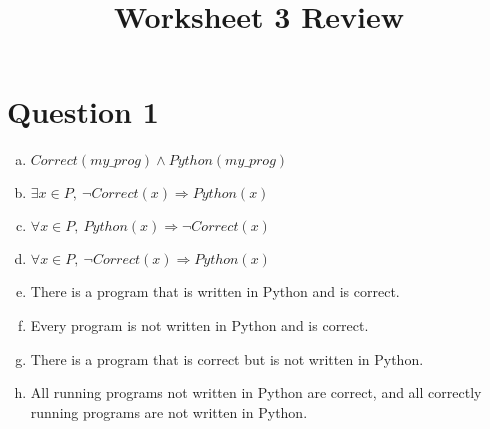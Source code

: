 \documentclass[12pt]{article}
\begin{document}
\title{Worksheet 3 Review}
\maketitle

\section*{Question 1}
\begin{enumerate}[a.]
    \item

    $Correct(my\_prog) \land Python(my\_prog)$

    \item

    $\exists x \in P,\:\neg Correct(x) \Rightarrow Python(x)$

    \item

    $\forall x \in P,\:Python(x) \Rightarrow \neg Correct(x)$

    \item

    $\forall x \in P,\:\neg Correct(x) \Rightarrow Python(x)$

    \item

    There is a program that is written in Python and is correct.

    \item

    Every program is not written in Python and is correct.

    \item

    There is a program that is correct but is not written in Python.

    \item

    All running programs not written in Python are correct, and all correctly
    running programs are not written in Python.

\end{enumerate}
\end{document}
